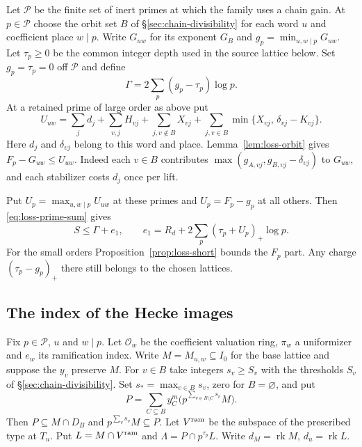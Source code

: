 Let $\mathcal P$ be the finite set of inert primes at which
the family uses a chain gain. At $p\in\mathcal P$ choose the orbit
set $B$ of \S\ref{sec:chain-divisibility} for each word $u$ and
coefficient place $w\mid p$. Write $G_{uw}$ for its exponent $G_B$ and
$g_p=\min_{u,w\mid p}G_{uw}$. Let $\tau_p\ge0$ be the common integer
depth used in the source lattice below. Set $g_p=\tau_p=0$ off
$\mathcal P$ and define
\begin{equation}\label{eq:loss-net-gain}
             \Gamma=2\sum_p(g_p-\tau_p)\log p .
\end{equation}
At a retained prime of large order as above put
\[
 U_{uw}=\sum_j d_j+\sum_{v,j}H_{vj}
       +\sum_{j,v\notin B}X_{vj}
       +\sum_{j,v\in B}\min\{X_{vj},\,\delta_{vj}-K_{vj}\}.
\]
Here $d_j$ and $\delta_{vj}$ belong to this word and place.
Lemma~\ref{lem:loss-orbit} gives $F_p-G_{uw}\le U_{uw}$. Indeed
each $v\in B$ contributes $\max(g_{A,vj},g_{B,vj}-\delta_{vj})$ to
$G_{uw}$, and each stabilizer costs $d_j$ once per lift.

Put $U_p=\max_{u,w\mid p}U_{uw}$ at these primes and
$U_p=F_p-g_p$ at all others. Then \eqref{eq:loss-prime-sum} gives
\begin{equation}\label{eq:loss-first-error}
 S\le\Gamma+e_1,\qquad e_1=R_d+2\sum_p(\tau_p+U_p)_+\log p .
\end{equation}
For the small orders Proposition~\ref{prop:loss-short} bounds the
$F_p$ part. Any charge $(\tau_p-g_p)_+$ there still belongs to the
chosen lattices.

\subsection{The index of the Hecke images}

Fix $p\in\mathcal P$, $u$ and $w\mid p$. Let $\mathcal O_w$ be the
coefficient valuation ring, $\pi_w$ a uniformizer and $e_w$ its
ramification index. Write $M=M_{u,w}\subseteq I_0$ for the base
lattice and suppose the $y_v$ preserve $M$. For $v\in B$ take
integers $s_v\ge S_v$ with the thresholds $S_v$ of
\S\ref{sec:chain-divisibility}. Set $s_*=\max_{v\in B}s_v$, zero
for $B=\varnothing$, and put
\[
 P=\sum_{C\subseteq B} y_C^m
         \bigl(p^{\sum_{v\in B\setminus C}s_v}M\bigr).
\]
Then $P\subseteq M\cap D_B$ and $p^{\sum_v s_v}M\subseteq P$.
Let $V^{\rm ram}$ be the subspace of the prescribed type at $T_u$.
Put $L=M\cap V^{\rm ram}$ and $\Lambda=P\cap p^{\tau_p}L$.
Write $d_M=\operatorname{rk}M$, $d_u=\operatorname{rk}L$.

